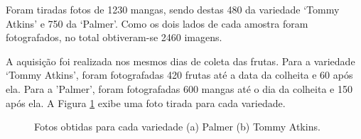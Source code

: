 Foram tiradas fotos de 1230 mangas, sendo destas 480 da variedade ‘Tommy Atkins’ e 750 da ‘Palmer’. Como os dois lados de cada amostra foram fotografados, no total obtiveram-se 2460 imagens.

A aquisição foi realizada nos mesmos dias de coleta das frutas. Para a variedade ‘Tommy Atkins’, foram fotografadas 420 frutas até a data da colheita e 60 após ela. Para a 'Palmer', foram fotografadas 600 mangas até o dia da colheita e 150 após ela. A Figura \ref{img:palmer_tommy} exibe uma foto tirada para cada variedade.

\begin{figure}[!htb]
\centering
    \caption{\label{img:palmer_tommy} Fotos obtidas para cada variedade (a) Palmer (b) Tommy Atkins.}

\end{figure}
